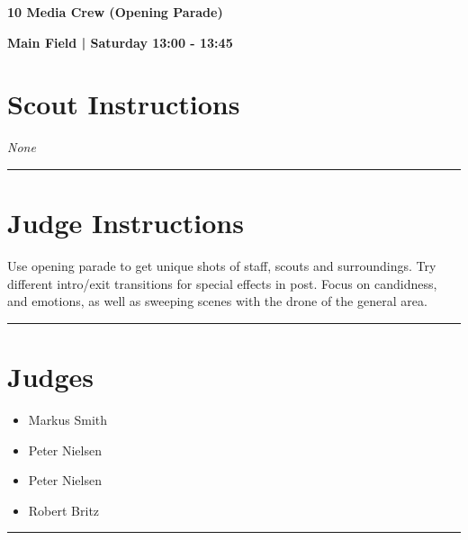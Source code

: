 \documentclass[10pt]{article}
\newcommand{\newtitle}[1]{\begin{center}{\Huge\bfseries #1 }\\ \vspace{5mm}\end{center}}
\newcommand{\newsubtitle}[1]{\begin{center}{\color{grey}\Large\bfseries #1 }\\ \vspace{5mm}\end{center}}
\begin{document}
	\vspace{1cm}


	\clearpage
		\newtitle{10 Media Crew (Opening Parade) }
	\newsubtitle{Main Field | Saturday 13:00 - 13:45}
		\setcounter{section}{9}
	\section*{Scout Instructions}
		\textit{None}
	
	\vspace{0.5cm}
	\hrule
	\vspace{0.5cm}

		\section*{Judge Instructions}
		Use opening parade to get unique shots of staff, scouts and surroundings. Try different intro/exit transitions for special effects in post. Focus on candidness, and emotions, as well as sweeping scenes with the drone of the general area.
\vspace{0.5cm}
	\hrule
	\vspace{0.5cm}
		\section*{\faUsers \: Judges}

		

	\begin{multicols}{2}

		\begin{itemize}
									\item Markus Smith
									\item Peter Nielsen
						\end{itemize}

		\vfill\null
		\columnbreak

		\begin{itemize}
									\item Peter Nielsen
									\item Robert Britz
						\end{itemize}

		\vfill\null

		\end{multicols}



			\vspace{0.5cm}
	\hrule
	\vspace{0.5cm}
\end{document}
